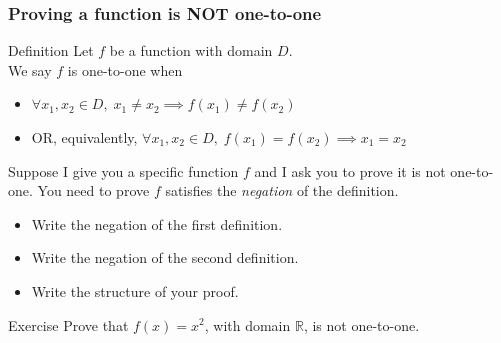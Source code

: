 \begin{frame}[t]
	\fontsize{13}{13}\selectfont
	\frametitle{Proving a function is NOT one-to-one}

	\begin{block}{Definition}
		Let $f$ be a function with domain $D$. \\ We say $f$ is one-to-one when
		\begin{itemize}
			\item \hfill $\displaystyle \forall x_{1}, x_{2}\in D, \; x_{1}\neq x_{2}\implies
				f(x_{1}) \neq f(x_{2})$

			\item OR, equivalently, \hfill $\displaystyle \forall x_{1}, x_{2}\in D, \;
				f(x_{1}) = f(x_{2}) \implies x_{1}= x_{2}$
		\end{itemize}
	\end{block}

	\vfill

	Suppose I give you a specific function $f$ and I ask you to prove it is not one-to-one.
	You need to prove $f$ satisfies the \emph{negation} of the definition.
	\begin{itemize}
		\item Write the negation of the first definition.

		\item Write the negation of the second definition.

		\item Write the structure of your proof.
	\end{itemize}

	\vfill

	\begin{block}{Exercise}
		Prove that $f(x) = x^{2}$, with domain $\mathbb{R}$, is not one-to-one.
	\end{block}
\end{frame}

